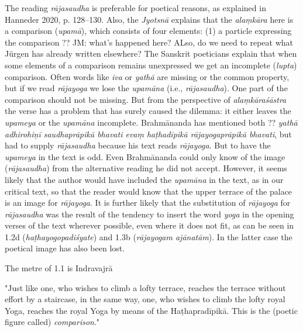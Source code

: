 \begin{ekdosis}
\begin{philcomm}[hp01_001]
The reading \emph{rājasaudha} is preferable for poetical reasons, as explained in Hanneder 2020, p. 128–130. Also, the \emph{Jyotsnā} explains that the \emph{alaṃkāra} here is a comparison (\emph{upamā}), which consists of four elements: (1) a particle expressing the comparison ?? JM: what's happened here? ALso, do we need to repeat what Jürgen has already written elsewhere?
The Sanskrit poeticians explain that when some elements of a comparison remains unexpressed we get an incomplete (\emph{lupta}) comparison. Often words like \emph{iva} or \emph{yathā} are missing or the common property, but if we read \emph{rājayoga} we lose the \emph{upamāna} (i.e., \emph{rājasaudha}). One part of the comparison should not be missing. But from the perspective of \emph{alaṃkāraśāstra} the verse has a problem that has surely caused the dilemma: it either leaves the \emph{upameya} or the \emph{upamāna} incomplete. Brahmānanda has mentioned both ?? \emph{yathā adhirohiṇī saudhaprāpikā bhavati evaṃ haṭhadīpikā rājayogaprāpikā bhavati}, but had to supply \emph{rājasaudha} because his text reads \emph{rājayoga}. But to have the \emph{upameya} in the text is odd. Even Brahmānanda could only know of the image (\emph{rājasaudha}) from the alternative reading he did not accept. However, it seems likely that the author would have included the \emph{upamāna} in the text, as in our critical text, so that the reader would know that the upper terrace of the palace is an image for \emph{rājayoga}. It is further likely that the substitution of \emph{rājayoga} for \emph{rājasaudha} was the result of the tendency to insert the word \emph{yoga} in the opening verses of the text wherever possible, even where it does not fit, as can be seen in 1.2d (\emph{haṭhayogopadiśyate}) and 1.3b (\emph{rājayogam ajānatām}). In the latter case the poetical image has also been lost.

The metre of 1.1 is Indravajrā

"Just like one, who wishes to climb a lofty terrace, reaches the terrace without effort by a
staircase, in the same way, one, who wishes to climb the lofty royal Yoga, reaches the royal Yoga
by means of the Haṭhapradīpikā. This is the (poetic figure called) \emph{comparison}."




\end{philcomm}
\end{ekdosis}
